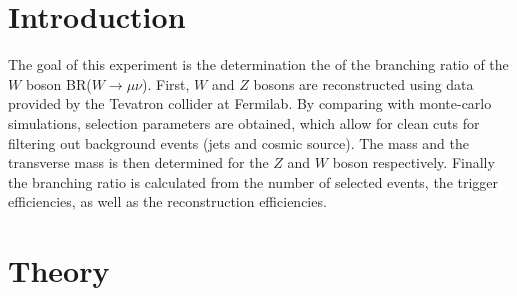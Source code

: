\documentclass[twoside,        %
               BCOR12mm,       %
               ngerman,english, %
               fleqn,headsepline=false,footsepline=false
              ]{Vorlage/MFPREPORT}
\begin{document}
\date{\today}
\CopyNotWanted

\maketitle


\tableofcontents

\clearpage
{}

\section{Introduction}
\label{sec:introduction}
The goal of this experiment is the determination the  of the branching ratio of the $W$ boson
BR($W\rightarrow\mu\nu$). First, $W$ and $Z$ bosons are reconstructed using
data provided by the Tevatron collider at Fermilab. By comparing with monte-carlo
simulations, selection parameters are obtained, which allow for clean cuts for
filtering out background events (jets and cosmic source). The mass and the
transverse mass is then determined for the $Z$ and $W$ boson respectively.
Finally the branching ratio is calculated from the number of selected events,
the trigger efficiencies, as well as the reconstruction efficiencies.


\section{Theory}
\label{sec:theory}
\end{document}
